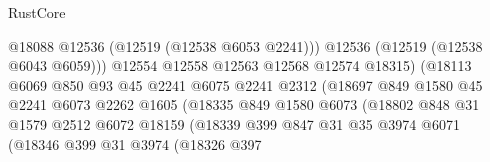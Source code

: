 \begin{lexlean}{RustCore}
\begin{coremodule}
                                            @18088
                                            @12536
                                            (@12519 (@12538 @6053 @2241)))
                                          @12536
                                          (@12519 (@12538 @6043 @6059)))
                                        @12554
                                        @12558
                                        @12563
                                        @12568
                                        @12574
                                        @18315)
                                      (@18113
                                        @6069
                                        @850
                                        @93
                                        @45
                                        @2241
                                        @6075
                                        @2241
                                        @2312
                                        (@18697
                                          @849
                                          @1580
                                          @45
                                          @2241
                                          @6073
                                          @2262
                                          @1605
                                          (@18335
                                            @849
                                            @1580
                                            @6073
                                            (@18802
                                              @848
                                              @31
                                              @1579
                                              @2512
                                              @6072
                                              @18159
                                              (@18339
                                                @399
                                                @847
                                                @31
                                                @35
                                                @3974
                                                @6071
                                                (@18346
                                                  @399
                                                  @31
                                                  @3974
                                                  (@18326
                                                    @397

\end{coremodule}
\end{lexlean}
